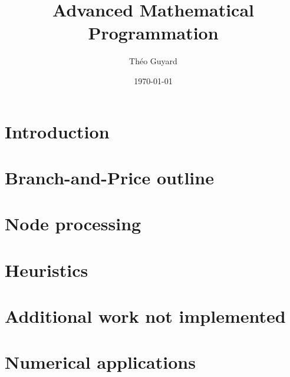 \documentclass{article}
\title{Advanced Mathematical Programmation}
\author{Théo Guyard}
\date{\today}
\begin{document}

\newpage

\tableofcontents
\newpage

\section{Introduction}


\newpage

\section{Branch-and-Price outline}


\newpage

\section{Node processing}



\newpage

\section{Heuristics}


\newpage

\section{Additional work not implemented}


\newpage

\section{Numerical applications}


\newpage

\printbibliography
\end{document}
